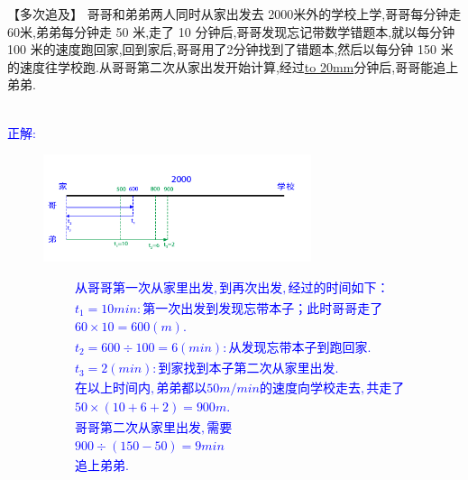\item {
    【多次追及】
    哥哥和弟弟两人同时从家出发去 2000米外的学校上学,哥哥每分钟走 60米,弟弟每分钟走 50 米,走了 10 分钟后,哥哥发现忘记带数学错题本,就以每分钟 100 米的速度跑回家,回到家后,哥哥用了2分钟找到了错题本,然后以每分钟 150 米的速度往学校跑.从哥哥第二次从家出发开始计算,经过\underline{\hbox to 20mm{}}分钟后,哥哥能追上弟弟.
    \ifshowSolution 
        \fangsong{}\textcolor{blue}{
            \\正解: \\
            \begin{figure}[H] 
                \centering
                \includegraphics[width=0.7\textwidth]{./pics/Chapter_3/seikai_2.png}
            \end{figure}
            \begin{align*}
                &从哥哥第一次从家里出发,到再次出发,经过的时间如下：\\
                &t_1=10min: 第一次出发到发现忘带本子；此时哥哥走了 \\
                &60\times 10 = 600 (m).\\
                &t_2=600\div 100 = 6(min): 从发现忘带本子到跑回家.\\
                &t_3=2(min): 到家找到本子第二次从家里出发.\\
                &在以上时间内,弟弟都以50m/min 的速度向学校走去,共走了\\
                &50\times (10+6+2) = 900 m.\\
                &哥哥第二次从家里出发,需要\\
                &900\div (150 - 50) = 9 min \\
                &追上弟弟.
            \end{align*}
        }
    \else
        \vspace{1cm}
    \fi
}

